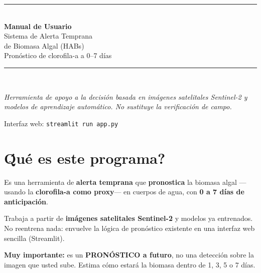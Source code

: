 \documentclass[11pt]{article}
\begin{document}
\begin{titlepage}
\centering
\vspace*{2.2cm}
{\color{lineac}\rule{\textwidth}{1.2pt}}\\[1.2cm]
{\headingfont\Huge\bfseries\color{aguaOsc} Manual de Usuario}\\[0.9cm]
{\headingfont\LARGE\color{agua} Sistema de Alerta Temprana\\[0.3cm] de Biomasa Algal (HABs)}\\[0.8cm]
{\Large Pron\'ostico de clorofila-a a 0--7 d\'ias}\\[1.2cm]
{\color{lineac}\rule{\textwidth}{1.2pt}}\\[2.5cm]

\begin{minipage}{0.85\textwidth}\centering\itshape\color{aguaOsc}
Herramienta de apoyo a la decisi\'on basada en im\'agenes satelitales Sentinel-2
y modelos de aprendizaje autom\'atico. No sustituye la verificaci\'on de campo.
\end{minipage}

\vfill
{\large Interfaz web: \texttt{streamlit run app.py}}\\[0.4cm]
\end{titlepage}

\tableofcontents
\newpage

\section{\'Qu\'e es este programa?}

Es una herramienta de \textbf{alerta temprana} que \textbf{pronostica} la biomasa
algal ---usando la \textbf{clorofila-a como proxy}--- en cuerpos de agua, con
\textbf{0 a 7 d\'ias de anticipaci\'on}.

Trabaja a partir de \textbf{im\'agenes satelitales Sentinel-2} y modelos ya
entrenados. No reentrena nada: envuelve la l\'ogica de pron\'ostico existente en una
interfaz web sencilla (Streamlit).

\begin{aviso}
\textbf{Muy importante:} es un \textbf{PRON\'OSTICO a futuro}, no una detecci\'on
sobre la imagen que usted sube. Estima c\'omo estar\'a la biomasa dentro de 1, 3, 5
o 7 d\'ias.
\end{aviso}
\end{document}
